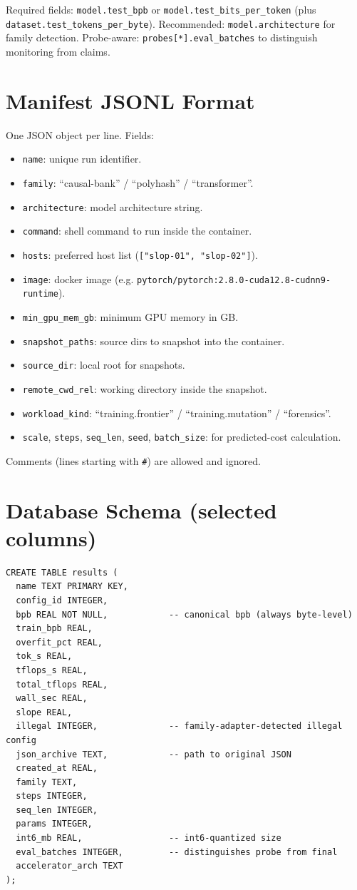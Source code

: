 \documentclass[11pt,openany]{book}
\theoremstyle{definition}
\theoremstyle{plain}
\begin{document}
Required fields: \texttt{model.test\_bpb} or
\texttt{model.test\_bits\_per\_token} (plus
\texttt{dataset.test\_tokens\_per\_byte}). Recommended:
\texttt{model.architecture} for family detection.
Probe-aware: \texttt{probes[*].eval\_batches} to distinguish monitoring
from claims.

\chapter{Manifest JSONL Format}

One JSON object per line. Fields:

\begin{itemize}
  \item \texttt{name}: unique run identifier.
  \item \texttt{family}: ``causal-bank'' / ``polyhash'' / ``transformer''.
  \item \texttt{architecture}: model architecture string.
  \item \texttt{command}: shell command to run inside the container.
  \item \texttt{hosts}: preferred host list (\texttt{["slop-01",
    "slop-02"]}).
  \item \texttt{image}: docker image (e.g.
    \texttt{pytorch/pytorch:2.8.0-cuda12.8-cudnn9-runtime}).
  \item \texttt{min\_gpu\_mem\_gb}: minimum GPU memory in GB.
  \item \texttt{snapshot\_paths}: source dirs to snapshot into the
    container.
  \item \texttt{source\_dir}: local root for snapshots.
  \item \texttt{remote\_cwd\_rel}: working directory inside the
    snapshot.
  \item \texttt{workload\_kind}: ``training.frontier'' /
    ``training.mutation'' / ``forensics''.
  \item \texttt{scale}, \texttt{steps}, \texttt{seq\_len}, \texttt{seed},
    \texttt{batch\_size}: for predicted-cost calculation.
\end{itemize}

Comments (lines starting with \texttt{\#}) are allowed and ignored.

\chapter{Database Schema (selected columns)}

\begin{lstlisting}[caption={results},basicstyle=\ttfamily\footnotesize]
CREATE TABLE results (
  name TEXT PRIMARY KEY,
  config_id INTEGER,
  bpb REAL NOT NULL,            -- canonical bpb (always byte-level)
  train_bpb REAL,
  overfit_pct REAL,
  tok_s REAL,
  tflops_s REAL,
  total_tflops REAL,
  wall_sec REAL,
  slope REAL,
  illegal INTEGER,              -- family-adapter-detected illegal config
  json_archive TEXT,            -- path to original JSON
  created_at REAL,
  family TEXT,
  steps INTEGER,
  seq_len INTEGER,
  params INTEGER,
  int6_mb REAL,                 -- int6-quantized size
  eval_batches INTEGER,         -- distinguishes probe from final
  accelerator_arch TEXT
);
\end{lstlisting}
\end{document}
